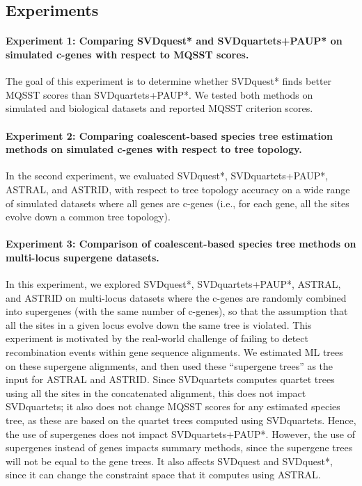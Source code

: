 \subsection{Experiments}

\paragraph{Experiment 1: Comparing SVDquest* and SVDquartets+PAUP* on simulated c-genes with respect to  MQSST scores. }

The goal of this experiment is to determine whether SVDquest* finds
better MQSST scores than SVDquartets+PAUP*. We tested both methods
on simulated and biological datasets and reported MQSST
criterion scores.


\paragraph{Experiment 2: Comparing coalescent-based species tree
  estimation methods on simulated c-genes with respect to tree topology. }


In the second experiment, we evaluated SVDquest*, SVDquartets+PAUP*, ASTRAL, and ASTRID, with respect to tree topology accuracy on a wide range of simulated
datasets where  all genes are c-genes (i.e., for each gene, all the sites evolve down a common tree topology).


\paragraph{Experiment 3: Comparison of coalescent-based species tree methods on multi-locus supergene datasets. }

In this experiment, we explored  SVDquest*, SVDquartets+PAUP*, ASTRAL,  and ASTRID  on   multi-locus datasets where the c-genes are randomly combined into supergenes (with the same number of c-genes), so that the assumption that 
all the sites in a given locus evolve down the same tree is violated.
This experiment
is motivated by the real-world challenge  of failing to detect
recombination events within gene sequence alignments.  
We estimated ML trees on these supergene
alignments, and then used these ``supergene trees'' as the input for ASTRAL and ASTRID.
Since SVDquartets computes quartet trees using all the sites in the concatenated alignment, this does not impact SVDquartets; it also
 does not change MQSST scores for any estimated species tree, as these are based on the  quartet trees computed using SVDquartets. 
 Hence, the use of supergenes does not impact SVDquartets+PAUP*.
 However, the use of supergenes instead of genes impacts summary methods, 
since  the supergene trees will not be equal to the gene trees.  It also affects SVDquest and SVDquest*, since it can change the constraint space that it computes using ASTRAL. 

